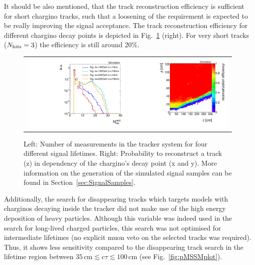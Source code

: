 It should be also mentioned, that the track reconstruction efficiency is sufficient for short chargino tracks, such that a loosening of the \nhits requirement is expected to be really improving the signal acceptance.
The track reconstruction efficiency for different chargino decay points is depicted in Fig.~\ref{fig:NHits_2Signal_noSelection_normalized} (right).
For very short tracks ($N_{\text{hits}}=3$) the efficiency is still around 20\%.\\
\begin{figure}[!t]
  \centering 
  \begin{tabular}{c}
  \includegraphics[width=0.49\textwidth]{figures/analysis_2/MotivationAndGeneralSearchStrategy/htrackNValid_log_chiTracksnoSelection.pdf}
  \includegraphics[width=0.49\textwidth]{figures/analysis_2/MotivationAndGeneralSearchStrategy/RecoEffTracksZoom.pdf}
  \end{tabular}
  \caption{Left: Number of measurements in the tracker system \nhits for four different signal lifetimes.
           Right: Probability to reconstruct a track (z) in dependency of the chargino's decay point (x and y).
           More information on the generation of the simulated signal samples can be found in Section~\ref{sec:SignalSamples}.} 
  \label{fig:NHits_2Signal_noSelection_normalized}
\end{figure}



Additionally, the search for disappearing tracks which targets models with charginos decaying inside the tracker did not make use of the high energy deposition of heavy particles. 
Although this variable was indeed used in the search for long-lived charged particles, this search was not optimised for intermediate lifetimes (\eg no explicit muon veto on the selected tracks was required). 
Thus, it shows less sensitivity compared to the disappearing track search in the lifetime region between $35\,\text{cm} \lesssim c\tau \lesssim 100\,\text{cm}$ (see Fig.~\ref{fig:pMSSMplot}).\\

